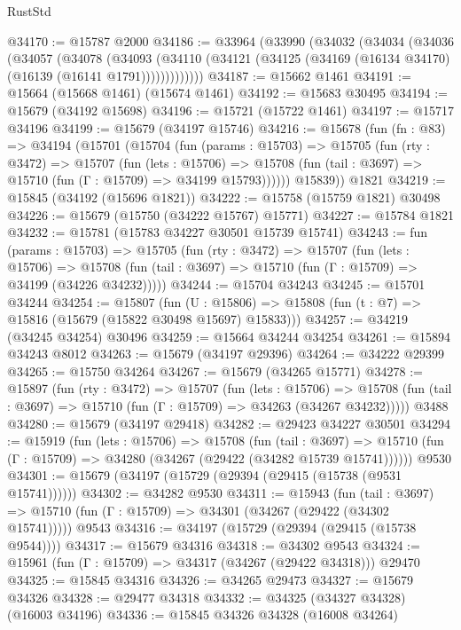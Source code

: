 \begin{lexlean}{RustStd}
\begin{coremodule}
@34170 := @15787 @2000
@34186 := @33964
    (@33990
      (@34032
        (@34034
          (@34036
            (@34057
              (@34078
                (@34093
                  (@34110 (@34121 (@34125 (@34169 (@16134 @34170) (@16139 (@16141 @1791)))))))))))))
@34187 := @15662 @1461
@34191 := @15664 (@15668 @1461) (@15674 @1461)
@34192 := @15683 @30495
@34194 := @15679 (@34192 @15698)
@34196 := @15721 (@15722 @1461)
@34197 := @15717 @34196
@34199 := @15679 (@34197 @15746)
@34216 := @15678
    (fun (fn : @83) =>
    @34194
      (@15701
        (@15704
          (fun (params : @15703) =>
          @15705
            (fun (rty : @3472) =>
            @15707
              (fun (lets : @15706) =>
              @15708 (fun (tail : @3697) => @15710 (fun (Γ : @15709) => @34199 @15793))))))
        @15839))
    @1821
@34219 := @15845 (@34192 (@15696 @1821))
@34222 := @15758 (@15759 @1821) @30498
@34226 := @15679 (@15750 (@34222 @15767) @15771)
@34227 := @15784 @1821
@34232 := @15781 (@15783 @34227 @30501 @15739 @15741)
@34243 := fun (params : @15703) =>
  @15705
    (fun (rty : @3472) =>
    @15707
      (fun (lets : @15706) =>
      @15708 (fun (tail : @3697) => @15710 (fun (Γ : @15709) => @34199 (@34226 @34232)))))
@34244 := @15704 @34243
@34245 := @15701 @34244
@34254 := @15807
    (fun (U : @15806) => @15808 (fun (t : @7) => @15816 (@15679 (@15822 @30498 @15697) @15833)))
@34257 := @34219 (@34245 @34254) @30496
@34259 := @15664 @34244 @34254
@34261 := @15894 @34243 @8012
@34263 := @15679 (@34197 @29396)
@34264 := @34222 @29399
@34265 := @15750 @34264
@34267 := @15679 (@34265 @15771)
@34278 := @15897
    (fun (rty : @3472) =>
    @15707
      (fun (lets : @15706) =>
      @15708 (fun (tail : @3697) => @15710 (fun (Γ : @15709) => @34263 (@34267 @34232)))))
    @3488
@34280 := @15679 (@34197 @29418)
@34282 := @29423 @34227 @30501
@34294 := @15919
    (fun (lets : @15706) =>
    @15708
      (fun (tail : @3697) =>
      @15710 (fun (Γ : @15709) => @34280 (@34267 (@29422 (@34282 @15739 @15741))))))
    @9530
@34301 := @15679 (@34197 (@15729 (@29394 (@29415 (@15738 (@9531 @15741))))))
@34302 := @34282 @9530
@34311 := @15943
    (fun (tail : @3697) => @15710 (fun (Γ : @15709) => @34301 (@34267 (@29422 (@34302 @15741)))))
    @9543
@34316 := @34197 (@15729 (@29394 (@29415 (@15738 @9544))))
@34317 := @15679 @34316
@34318 := @34302 @9543
@34324 := @15961 (fun (Γ : @15709) => @34317 (@34267 (@29422 @34318))) @29470
@34325 := @15845 @34316
@34326 := @34265 @29473
@34327 := @15679 @34326
@34328 := @29477 @34318
@34332 := @34325 (@34327 @34328) (@16003 @34196)
@34336 := @15845 @34326 @34328 (@16008 @34264)

\end{coremodule}
\end{lexlean}
